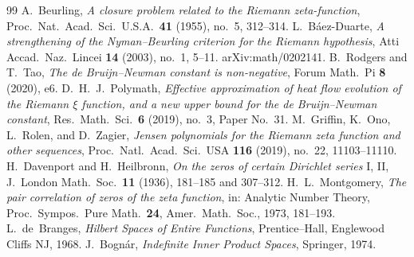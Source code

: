 \documentclass[11pt]{amsart}
\theoremstyle{definition}
\theoremstyle{remark}
\theoremstyle{definition}
\begin{document}
\begin{thebibliography}{99}
 A.~Beurling, \emph{A closure problem related to the Riemann zeta-function},
Proc.\ Nat.\ Acad.\ Sci.\ U.S.A.\ \textbf{41} (1955), no.~5, 312--314.
 L.~B\'aez-Duarte, \emph{A strengthening of the Nyman--Beurling criterion for
the Riemann hypothesis}, Atti Accad.\ Naz.\ Lincei \textbf{14} (2003), no.~1, 5--11.
arXiv:math/0202141.
 B.~Rodgers and T.~Tao, \emph{The de Bruijn--Newman constant is non-negative},
Forum Math.\ Pi \textbf{8} (2020), e6.
 D.~H.~J.~Polymath, \emph{Effective approximation of heat flow evolution of the
Riemann $\xi$ function, and a new upper bound for the de Bruijn--Newman constant}, Res.\ Math.\
Sci.\ \textbf{6} (2019), no.~3, Paper No.~31.
 M.~Griffin, K.~Ono, L.~Rolen, and D.~Zagier, \emph{Jensen polynomials for the
Riemann zeta function and other sequences}, Proc.\ Natl.\ Acad.\ Sci.\ USA \textbf{116} (2019),
no.~22, 11103--11110.
 H.~Davenport and H.~Heilbronn, \emph{On the zeros of certain Dirichlet
series} I, II, J.\ London Math.\ Soc.\ \textbf{11} (1936), 181--185 and 307--312.
\bibitem{Montgomery} H.~L.~Montgomery, \emph{The pair correlation of zeros of the zeta function},
in: Analytic Number Theory, Proc.\ Sympos.\ Pure Math.\ \textbf{24}, Amer.\ Math.\ Soc., 1973,
181--193.
 L.~de~Branges, \emph{Hilbert Spaces of Entire Functions}, Prentice--Hall,
Englewood Cliffs NJ, 1968.
 J.~Bogn\'ar, \emph{Indefinite Inner Product Spaces}, Springer, 1974.

\end{thebibliography}
\end{document}
